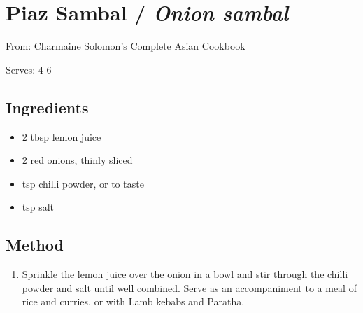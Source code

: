 \clearpage
\section{Piaz Sambal / \emph{Onion sambal}}


From: Charmaine Solomon's Complete Asian Cookbook

Serves: 4-6

\subsection{Ingredients}

\begin{itemize}
	\item 2 tbsp lemon juice 
	\item 2 red onions, thinly sliced 
	\item {} tsp chilli powder, or to taste 
	\item {} tsp salt 
\end{itemize}

\subsection{Method}

\begin{enumerate}
	\item Sprinkle the lemon juice over the onion in a bowl and stir through the chilli powder and salt until well combined. Serve as an accompaniment to a meal of rice and curries, or with Lamb kebabs and Paratha.
\end{enumerate}

